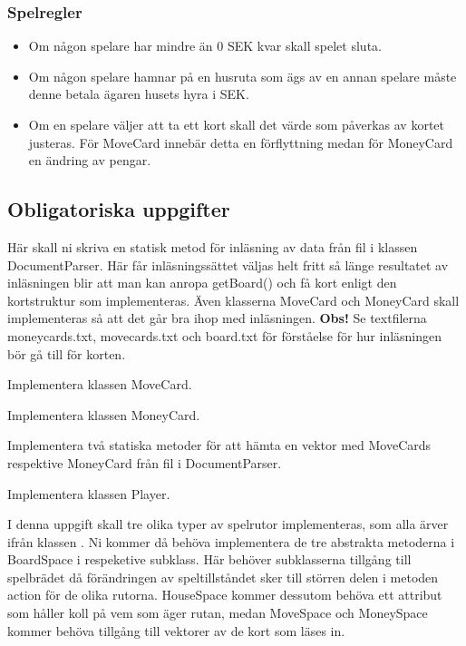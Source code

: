 \subsubsection{Spelregler}

\begin{itemize}
\item Om någon spelare har mindre än 0 SEK kvar skall spelet sluta.
\item Om någon spelare hamnar på en husruta som ägs av en annan spelare måste denne betala ägaren husets hyra i SEK.
\item Om en spelare väljer att ta ett kort skall det värde som påverkas av kortet justeras. För MoveCard innebär detta en förflyttning medan för MoneyCard en ändring av pengar.

\end{itemize}



\subsection{Obligatoriska uppgifter}

\Task Här skall ni skriva en statisk metod för inläsning av data från fil i klassen DocumentParser. Här får inläsningssättet väljas helt fritt så länge resultatet av inläsningen blir att man kan anropa getBoard() och få kort enligt den kortstruktur som implementeras. Även klasserna MoveCard och MoneyCard skall implementeras så att det går bra ihop med inläsningen.
\newline
\newline
\noindent
\textbf{Obs!} Se textfilerna moneycards.txt, movecards.txt och board.txt för förståelse för hur inläsningen bör gå till för korten. 

\Subtask Implementera klassen MoveCard.

\Subtask Implementera klassen MoneyCard.

\Subtask Implementera två statiska metoder för att hämta en vektor med MoveCards respektive MoneyCard från fil i DocumentParser.

\Subtask Implementera klassen Player.

\Task I denna uppgift skall tre olika typer av spelrutor implementeras, som alla ärver ifrån klassen . Ni kommer då behöva implementera de tre abstrakta metoderna i BoardSpace i respeketive subklass. Här behöver subklasserna tillgång till spelbrädet då förändringen av speltillståndet sker till störren delen i metoden action för de olika rutorna. HouseSpace kommer dessutom behöva ett attribut som håller koll på vem som äger rutan, medan MoveSpace och MoneySpace kommer behöva tillgång till vektorer av de kort som läses in.

